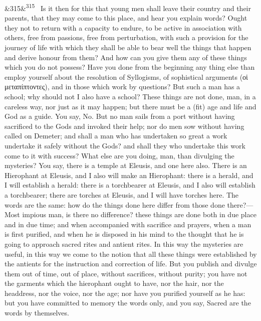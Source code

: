 \documentclass[12pt]{article}
\newcommand{\para}[1][]{\par\noindent\ifx&#1&\else\textsuperscript{\footnotesize #1}~\fi}
\begin{document}
\para[315] Is it then for this that young men shall leave their country and their parents, that they may come to this place, and hear you explain words? Ought they not to return with a capacity to endure, to be active in association with others, free from passions, free from perturbation, with such a provision for the journey of life with which they shall be able to bear well the things that happen and derive honour from them? And how can you give them any of these things which you do not possess? Have you done from the beginning any thing else than employ yourself about the resolution of Syllogisms, of sophistical arguments (οἱ μεταπίπτοντες), and in those which work by questions? But such a man has a school; why should not I also have a school? These things are not done, man, in a careless way, nor just as it may happen; but there must be a (fit) age and life and God as a guide. You say, No. But no man sails from a port without having sacrificed to the Gods and invoked their help; nor do men sow without having called on Demeter; and shall a man who has undertaken so great a work undertake it safely without the Gods? and shall they who undertake this work come to it with success? What else are you doing, man, than divulging the mysteries? You say, there is a temple at Eleusis, and one here also. There is an Hierophant at Eleusis, and I also will make an Hierophant: there is a herald, and I will establish a herald: there is a torchbearer at Eleusis, and I also will establish a torchbearer; there are torches at Eleusis, and I will have torches here. The words are the same: how do the things done here differ from those done there?—Most impious man, is there no difference? these things are done both in due place and in due time; and when accompanied with sacrifice and prayers, when a man is first purified, and when he is disposed in his mind to the thought that he is going to approach sacred rites and antient rites. In this way the mysteries are useful, in this way we come to the notion that all these things were established by the antients for the instruction and correction of life. But you publish and divulge them out of time, out of place, without sacrifices, without purity; you have not the garments which the hierophant ought to have, nor the hair, nor the headdress, nor the voice, nor the age; nor have you purified yourself as he has: but you have committed to memory the words only, and you say, Sacred are the words by themselves.
\end{document}
